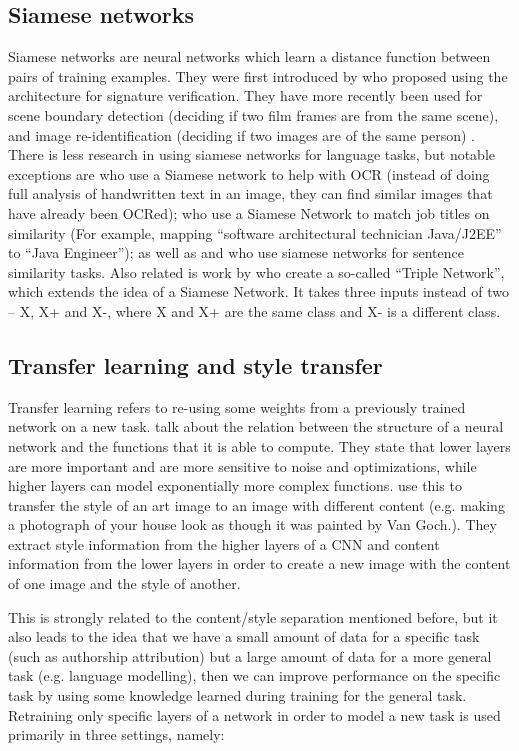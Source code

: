 \subsection*{Siamese networks}
Siamese networks are neural networks which learn a distance function between pairs of training examples. They were first introduced by  
\citep{bromley1993signature} who proposed using the architecture for signature verification. They have more recently been used for scene boundary detection (deciding if two film frames are from the same scene), 
\cite{baraldi2015deep} and image re-identification (deciding if two images are of the same person) \cite{zhu2017deep}. There is less research in using siamese networks for language tasks, but notable exceptions are 
\citep{hosseini2015similarity} who use a Siamese network to help with OCR (instead of doing full analysis of handwritten text in an image, they can find similar images that have already been OCRed);
\citep{neculoiu2016learning} who use a Siamese Network to match job titles on similarity (For example, mapping ``software architectural technician Java/J2EE'' to ``Java Engineer''); 
as well as \citep{mueller2016siamese} and \citep{yin2015abcnn} who use siamese networks for sentence similarity tasks. Also related is work by 
\citep{hoffer2015deep} who create a so-called ``Triple Network'', which extends the idea of a Siamese Network. It takes three inputs instead of two -- X, X+ and X-, where X and X+ are the same class and X- is a different class.


\subsection*{Transfer learning and style transfer}
Transfer learning refers to re-using some weights from a previously trained network on a new task. 
\cite{raghu2016expressive} talk about the relation between the structure of a neural network and the functions that it is able to compute. They state that lower layers are more important and are more sensitive to noise and optimizations, while higher layers can model exponentially more complex functions. 
\citep{gatys2015neural} use this to transfer the style of an art image to an image with different content (e.g. making a photograph of your house look as though it was painted by Van Goch.). 
They extract style information from the higher layers of a CNN and content information from the lower layers in order to create a new image with the content of one image and the style of another.

This is strongly related to the content/style separation mentioned before, but it also leads to the idea that we have a small amount of data for a specific task (such as authorship attribution) but a large amount of data for a more general task (e.g. language modelling), then we can improve performance on the specific task by using some knowledge learned during training for the general task. Retraining only specific layers of a network in order to model a new task is used primarily in three settings, namely:


